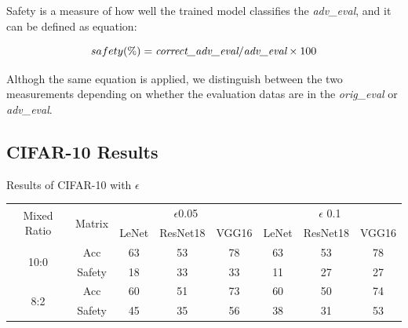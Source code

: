 \documentclass[journal,article,submit,moreauthors,pdftex]{Definitions/mdpi}
\begin{document}
Safety is a measure of how well the trained model classifies the {\it adv\_eval}, and it can be defined as equation:

\begin{equation}
    safety(\%) = \text{{\it correct\_adv\_eval}} / \text{{\it adv\_eval}} \times 100
\end{equation}

Althogh the same equation is applied, we distinguish between the two measurements depending on whether the evaluation datas are in the {\it orig\_eval} or {\it adv\_eval}.

\subsection{CIFAR-10 Results}

\begin{specialtable}[H]
    \centering
    \caption{Results of CIFAR-10 with \begin{math}\epsilon\end{math}}
    \label{cifar10-result}
    {\small
    \begin{tabular}{|c|c|c|c|c|c|c|c|}
    \hline
    \multirow{2}{*}{Mixed Ratio} & \multirow{2}{*}{Matrix} & \multicolumn{3}{c|}{\begin{math}\epsilon\end{math}0.05}            & \multicolumn{3}{c|}{\begin{math}\epsilon\end{math} 0.1}         \\ \cline{3-8} 
                                 &                           & LeNet               & ResNet18              & VGG16              & LeNet              & ResNet18              & VGG16              \\ \hline
    \multirow{2}{*}{10:0}        & Acc                       & 63                  & 53                    & 78                 & 63                 & 53                    & 78                 \\ \cline{2-8} 
                                 & Safety                    & 18                  & 33                    & 33                 & 11                 & 27                    & 27                 \\ \hline
    \multirow{2}{*}{8:2}         & Acc                       & 60                  & 51                    & 73                 & 60                 & 50                    & 74                 \\ \cline{2-8} 
                                 & Safety                    & 45                  & 35                    & 56                 & 38                 & 31                    & 53                 \\ \hline

\end{tabular}}
\end{specialtable}
\end{document}
